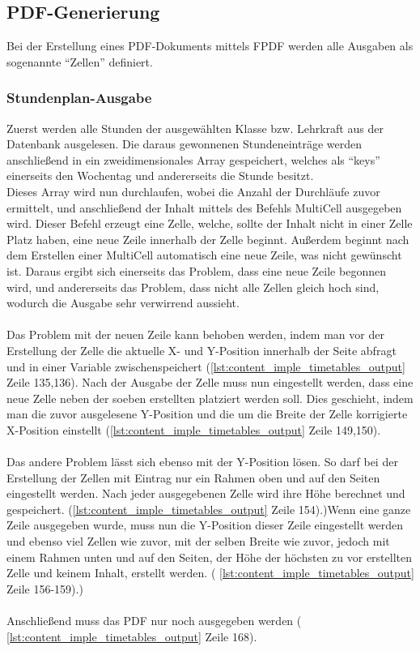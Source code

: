 \newpage
\subsection{PDF-Generierung}
Bei der Erstellung eines PDF-Dokuments mittels FPDF werden alle Ausgaben als sogenannte \enquote{Zellen} definiert.
\subsubsection{Stundenplan-Ausgabe}
Zuerst werden alle Stunden der ausgewählten Klasse bzw. Lehrkraft aus der Datenbank ausgelesen. Die daraus gewonnenen Stundeneinträge werden anschließend in ein zweidimensionales Array gespeichert, welches als \enquote{keys} einerseits den Wochentag und andererseits die Stunde besitzt. \\
Dieses Array wird nun durchlaufen, wobei die Anzahl der Durchläufe zuvor ermittelt, und anschließend der Inhalt mittels des Befehls MultiCell ausgegeben wird. Dieser Befehl erzeugt eine Zelle, welche, sollte der Inhalt nicht in einer Zelle Platz haben, eine neue Zeile innerhalb der Zelle beginnt. Außerdem beginnt nach dem Erstellen einer MultiCell automatisch eine neue Zeile, was nicht gewünscht ist. Daraus ergibt sich einerseits das Problem, dass eine neue Zeile begonnen wird, und andererseits das Problem, dass nicht alle Zellen gleich hoch sind, wodurch die Ausgabe sehr verwirrend aussieht. \\\\
Das Problem mit der neuen Zeile kann behoben werden, indem man vor der Erstellung der Zelle die aktuelle X- und Y-Position innerhalb der Seite abfragt und in einer Variable zwischenspeichert (\autoref{lst:content_imple_timetables_output} Zeile 135,136). Nach der Ausgabe der Zelle muss nun eingestellt werden, dass eine neue Zelle neben der soeben erstellten platziert werden soll. Dies geschieht, indem man die zuvor ausgelesene Y-Position und die um die Breite der Zelle korrigierte X-Position einstellt (\autoref{lst:content_imple_timetables_output} Zeile 149,150).\\\\
Das andere Problem lässt sich ebenso mit der Y-Position lösen. So darf bei der Erstellung der Zellen mit Eintrag nur ein Rahmen oben und auf den Seiten eingestellt werden. Nach jeder ausgegebenen Zelle wird ihre Höhe berechnet und gespeichert. (\autoref{lst:content_imple_timetables_output} Zeile 154).)Wenn eine ganze Zeile ausgegeben wurde, muss nun die Y-Position dieser Zeile eingestellt werden und ebenso viel Zellen wie zuvor, mit der selben Breite wie zuvor, jedoch mit einem Rahmen unten und auf den Seiten, der Höhe der höchsten zu vor erstellten Zelle und keinem Inhalt, erstellt werden.  ( \autoref{lst:content_imple_timetables_output} Zeile 156-159).)
\\\\
Anschließend muss das PDF nur noch ausgegeben werden ( \autoref{lst:content_imple_timetables_output} Zeile 168). 

